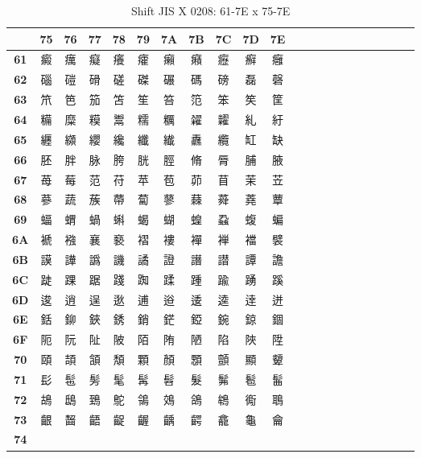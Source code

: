 \begin{table}[H]
\centering
\caption{Shift JIS X 0208: 61-7E x 75-7E}
\begin{tabular}{|Sc|Sc|Sc|Sc|Sc|Sc|Sc|Sc|Sc|Sc|Sc|}
\hline
 & \textbf{75} & \textbf{76} & \textbf{77} & \textbf{78} & \textbf{79} & \textbf{7A} & \textbf{7B} & \textbf{7C} & \textbf{7D} & \textbf{7E} \\ \hline
\textbf{61} & 癜 & 癘 & 癡 & 癢 & 癨 & 癩 & 癪 & 癧 & 癬 & 癰 \\ \hline
\textbf{62} & 碯 & 磑 & 磆 & 磋 & 磔 & 碾 & 碼 & 磅 & 磊 & 磬 \\ \hline
\textbf{63} & 笊 & 笆 & 笳 & 笘 & 笙 & 笞 & 笵 & 笨 & 笶 & 筐 \\ \hline
\textbf{64} & 糒 & 糜 & 糢 & 鬻 & 糯 & 糲 & 糴 & 糶 & 糺 & 紆 \\ \hline
\textbf{65} & 纒 & 纐 & 纓 & 纔 & 纖 & 纎 & 纛 & 纜 & 缸 & 缺 \\ \hline
\textbf{66} & 胚 & 胖 & 脉 & 胯 & 胱 & 脛 & 脩 & 脣 & 脯 & 腋 \\ \hline
\textbf{67} & 苺 & 莓 & 范 & 苻 & 苹 & 苞 & 茆 & 苜 & 茉 & 苙 \\ \hline
\textbf{68} & 蔘 & 蔬 & 蔟 & 蔕 & 蔔 & 蓼 & 蕀 & 蕣 & 蕘 & 蕈 \\ \hline
\textbf{69} & 蝠 & 蝟 & 蝸 & 蝌 & 蝎 & 蝴 & 蝗 & 蝨 & 蝮 & 蝙 \\ \hline
\textbf{6A} & 褫 & 襁 & 襄 & 褻 & 褶 & 褸 & 襌 & 褝 & 襠 & 襞 \\ \hline
\textbf{6B} & 謨 & 譁 & 譌 & 譏 & 譎 & 證 & 譖 & 譛 & 譚 & 譫 \\ \hline
\textbf{6C} & 跿 & 踝 & 踞 & 踐 & 踟 & 蹂 & 踵 & 踰 & 踴 & 蹊 \\ \hline
\textbf{6D} & 逡 & 逍 & 逞 & 逖 & 逋 & 逧 & 逶 & 逵 & 逹 & 迸 \\ \hline
\textbf{6E} & 銛 & 鉚 & 鋏 & 銹 & 銷 & 鋩 & 錏 & 鋺 & 鍄 & 錮 \\ \hline
\textbf{6F} & 阨 & 阮 & 阯 & 陂 & 陌 & 陏 & 陋 & 陷 & 陜 & 陞 \\ \hline
\textbf{70} & 頤 & 頡 & 頷 & 頽 & 顆 & 顏 & 顋 & 顫 & 顯 & 顰 \\ \hline
\textbf{71} & 髟 & 髢 & 髣 & 髦 & 髯 & 髫 & 髮 & 髴 & 髱 & 髷 \\ \hline
\textbf{72} & 鴣 & 鴟 & 鵄 & 鴕 & 鴒 & 鵁 & 鴿 & 鴾 & 鵆 & 鵈 \\ \hline
\textbf{73} & 齦 & 齧 & 齬 & 齪 & 齷 & 齲 & 齶 & 龕 & 龜 & 龠 \\ \hline
\textbf{74} &  &  &  &  &  &  &  &  &  &  \\ \hline

\end{tabular}
\end{table}
